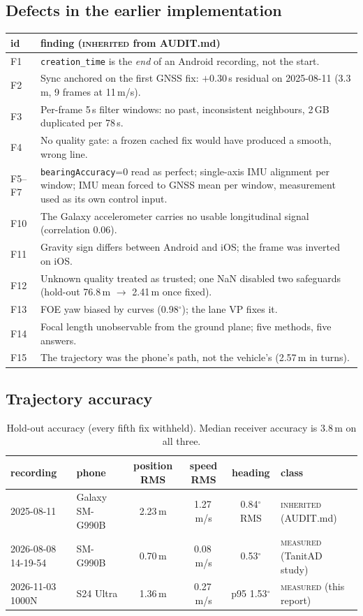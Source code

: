 \documentclass[10pt,a4paper]{article}
\newcommand{\meas}{\textsc{measured}}
\newcommand{\inh}{\textsc{inherited}}
\begin{document}
\subsection{Defects in the earlier implementation}
\begin{table}[H]
\centering\small
\begin{tabularx}{\textwidth}{@{}lL@{}}
\toprule
id & finding (\inh{} from AUDIT.md) \\
\midrule
F1 & \texttt{creation\_time} is the \emph{end} of an Android recording, not the start. \\
F2 & Sync anchored on the first GNSS fix: $+0.30$\,s residual on 2025-08-11 (3.3\,m, 9 frames at 11\,m/s). \\
F3 & Per-frame 5\,s filter windows: no past, inconsistent neighbours, 2\,GB duplicated per 78\,s. \\
F4 & No quality gate: a frozen cached fix would have produced a smooth, wrong line. \\
F5--F7 & \texttt{bearingAccuracy}=0 read as perfect; single-axis IMU alignment per window; IMU mean forced to GNSS mean per window, measurement used as its own control input. \\
F10 & The Galaxy accelerometer carries no usable longitudinal signal (correlation 0.06). \\
F11 & Gravity sign differs between Android and iOS; the frame was inverted on iOS. \\
F12 & Unknown quality treated as trusted; one NaN disabled two safeguards (hold-out 76.8\,m $\to$ 2.41\,m once fixed). \\
F13 & FOE yaw biased by curves (0.98$^\circ$); the lane VP fixes it. \\
F14 & Focal length unobservable from the ground plane; five methods, five answers. \\
F15 & The trajectory was the phone's path, not the vehicle's (2.57\,m in turns). \\
\bottomrule
\end{tabularx}
\end{table}

\subsection{Trajectory accuracy}
\begin{table}[H]
\centering\small
\begin{tabularx}{\textwidth}{@{}p{2.8cm}p{2.6cm}ccc>{\raggedright\arraybackslash}X@{}}
\toprule
recording & phone & position RMS & speed RMS & heading & class \\
\midrule
2025-08-11 & Galaxy SM-G990B & 2.23\,m & 1.27\,m/s & 0.84$^\circ$ RMS & \inh{} (AUDIT.md) \\
2026-08-08 14-19-54 & SM-G990B & 0.70\,m & 0.08\,m/s & 0.53$^\circ$ & \meas{} (TanitAD study) \\
2026-11-03 1000N & S24 Ultra & 1.36\,m & 0.27\,m/s & p95 1.53$^\circ$ & \meas{} (this report) \\
\bottomrule
\end{tabularx}
\caption{Hold-out accuracy (every fifth fix withheld). Median receiver accuracy is 3.8\,m on all three.}
\end{table}
\end{document}
